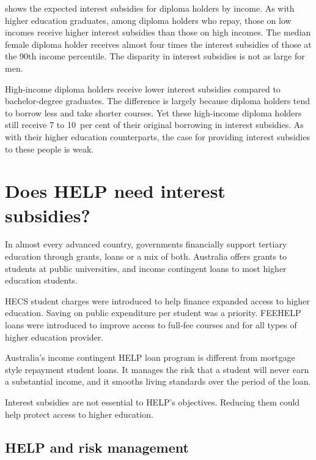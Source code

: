 \documentclass{grattan}
\begin{document}
 shows the expected interest subsidies for diploma holders by income.
As with higher education graduates, among diploma holders who repay, those on low incomes receive higher interest subsidies than those on high incomes.
The median female diploma holder receives almost four times the interest subsidies of those at the 90{th} income percentile.
The disparity in interest subsidies is not as large for men.

High-income diploma holders receive lower interest subsidies compared to bachelor-degree graduates.
The difference is largely because diploma holders tend to borrow less and take shorter courses.
Yet these high-income diploma holders still receive 7 to 10~per cent of their original borrowing in interest subsidies.
As with their higher education counterparts, the case for providing interest subsidies to these people is weak.



\chapter[Does HELP need interest subsidies?]{Does \gls{HELP} need interest subsidies?}\label{chap:4-does-help-need-interest-subsidies}

In almost every advanced country, governments financially support tertiary education through grants, loans or a mix of both.
Australia offers grants to students at public universities, and income contingent loans to most higher education students.

\gls{HECS} student charges were introduced to help finance expanded access to higher education.
Saving on public expenditure per student was a priority.
\gls{FEEHELP} loans were introduced to improve access to full-fee courses and for all types of higher education provider.

Australia's income contingent \gls{HELP} loan program is different from mortgage style repayment student loans. It manages the risk that a student will never earn a substantial income, and it smooths living standards over the period of the loan.

Interest subsidies are not essential to \gls{HELP}'s objectives. Reducing them could help protect access to higher education.

\section[HELP and risk management]{\gls{HELP} and risk management}\label{help-and-risk-management}
\end{document}
